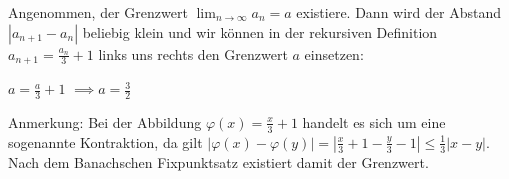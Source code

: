 \item Angenommen, der Grenzwert $\lim_{n\to\infty}a_n = a$ existiere. Dann wird der Abstand $|a_{n+1}-a_n|$ beliebig klein und wir können in der rekursiven Definition $a_{n+1} = \frac{a_n}{3}+1$ links uns rechts den Grenzwert $a$ einsetzen:

$a = \frac{a}{3} + 1$ $\implies a = \frac{3}{2}$

Anmerkung: Bei der Abbildung $\varphi(x)=\frac{x}{3}+1$ handelt es sich um eine sogenannte Kontraktion, da gilt $|\varphi(x)-\varphi(y)| = |\frac{x}{3}+1-\frac{y}{3}-1| \le \frac{1}{3}|x-y|$. Nach dem Banachschen Fixpunktsatz existiert damit der Grenzwert.
